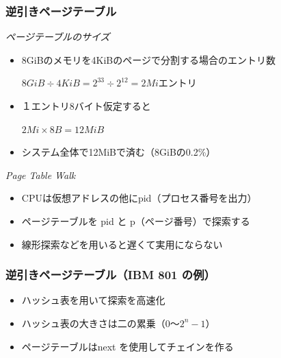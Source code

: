 \documentclass[unicode,handout]{beamer}                   %
\begin{document}
\begin{frame}
  \frametitle{逆引きページテーブル}
  \emph{ページテーブルのサイズ}
  \begin{itemize}
  \item 8GiBのメモリを4KiBのページで分割する場合のエントリ数\\
    \centerline{$8GiB \div 4KiB = 2^{33} \div 2^{12} = 2Mi$エントリ}
  \item １エントリ8バイト仮定すると
    \centerline{$2Mi \times 8B = 12MiB$}
  \item システム全体で12MiBで済む（8GiBの0.2\%）
  \end{itemize}
  \vfill
  \emph{Page Table Walk}
  \begin{itemize}
  \item CPUは仮想アドレスの他にpid（プロセス番号を出力）
  \item ページテーブルを pid と p（ページ番号）で探索する
  \item 線形探索などを用いると遅くて実用にならない
  \end{itemize}
\end{frame}

\begin{frame}
  \frametitle{逆引きページテーブル（IBM 801 の例）}
  \begin{itemize}
  \item ハッシュ表を用いて探索を高速化
  \item ハッシュ表の大きさは二の累乗（$0 〜 2^n-1$）
  \item ページテーブルはnext を使用してチェインを作る
  \end{itemize}
\end{frame}
\end{document}
